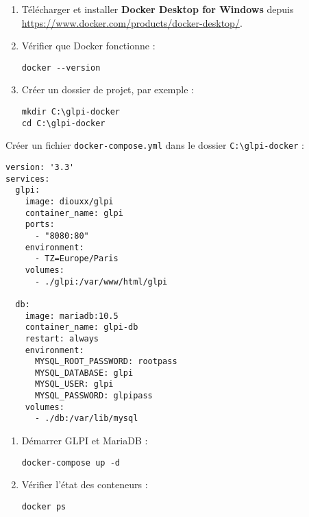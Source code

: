 \documentclass[11pt,a4paper]{article}
\begin{document}
\begin{tcolorbox}[title={1. Préparation de l’environnement}]
\begin{enumerate}
  \item Télécharger et installer \textbf{Docker Desktop for Windows} depuis \url{https://www.docker.com/products/docker-desktop/}.  
  \item Vérifier que Docker fonctionne :
\begin{verbatim}
docker --version
\end{verbatim}
  \item Créer un dossier de projet, par exemple :
\begin{verbatim}
mkdir C:\glpi-docker
cd C:\glpi-docker
\end{verbatim}
\end{enumerate}
\end{tcolorbox}

\begin{tcolorbox}[title={2. Création du fichier Docker Compose}]
Créer un fichier \texttt{docker-compose.yml} dans le dossier \texttt{C:\textbackslash glpi-docker} :  

\begin{verbatim}
version: '3.3'
services:
  glpi:
    image: diouxx/glpi
    container_name: glpi
    ports:
      - "8080:80"
    environment:
      - TZ=Europe/Paris
    volumes:
      - ./glpi:/var/www/html/glpi

  db:
    image: mariadb:10.5
    container_name: glpi-db
    restart: always
    environment:
      MYSQL_ROOT_PASSWORD: rootpass
      MYSQL_DATABASE: glpi
      MYSQL_USER: glpi
      MYSQL_PASSWORD: glpipass
    volumes:
      - ./db:/var/lib/mysql
\end{verbatim}
\end{tcolorbox}

\begin{tcolorbox}[title={3. Démarrage des conteneurs}]
\begin{enumerate}
  \item Démarrer GLPI et MariaDB :
\begin{verbatim}
docker-compose up -d
\end{verbatim}

  \item Vérifier l’état des conteneurs :
\begin{verbatim}
docker ps
\end{verbatim}
\end{enumerate}
\end{tcolorbox}
\end{document}
